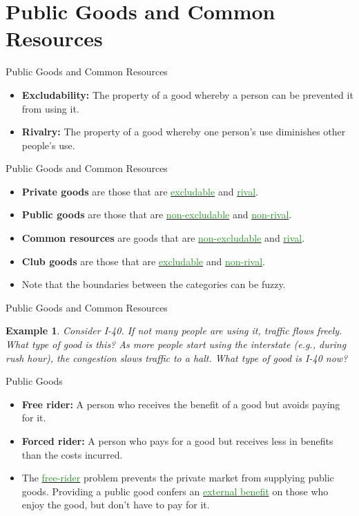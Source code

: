 \documentclass[xcolor={dvipsnames},pdf, hyperref={colorlinks=true, citecolor=ForestGreen, linkcolor=BlueViolet, urlcolor=Magenta}]{beamer}
\newtheorem{exmp}{Example}[section]
\newcommand{\defn}[1]{\textbf{#1}}
\newcommand{\ddp}[1]{{\textcolor{ForestGreen}{#1}}}
\newcommand{\dd}[1]{{\underline{\textcolor{ForestGreen}{#1}}}}
\begin{document}
\section{Public Goods and Common Resources}

\begin{frame}{Public Goods and Common Resources}
\begin{itemize}
	\item \defn{Excludability:} The property of a good whereby a person can be prevented it from using it.
	\item \defn{Rivalry:} The property of a good whereby one person's use diminishes other people's use.
\end{itemize}
\end{frame}

\begin{frame}{Public Goods and Common Resources}
	\begin{itemize}
		\item \textbf{Private goods} are those that are \dd{excludable} and \dd{rival}.
		\item \textbf{Public goods} are those that are \dd{non-excludable} and \dd{non-rival}.
		\item \textbf{Common resources} are goods that are \dd{non-excludable} and \dd{rival}.
		\item \textbf{Club goods} are those that are \dd{excludable} and \dd{non-rival}.
		\item Note that the boundaries between the categories can be fuzzy.
	\end{itemize}
\end{frame}

\begin{frame}{Public Goods and Common Resources}

	\begin{exmp} 
		Consider I-40. If not many people are using it, traffic flows freely. What type of good is this? As more people start using the interstate (e.g., during rush hour), the congestion slows traffic to a halt. What type of good is I-40 now?
	\end{exmp}
\pause	\ddp{Originally: public good. With congestion: common resource}
	
\end{frame}

\begin{frame}{Public Goods}
	\begin{itemize}
		\item 	\defn{Free rider:} A person who receives the benefit of a good but avoids paying for it.
		\item \defn{Forced rider:} A person who pays for a good but receives less in benefits than the costs incurred.
		\item The \dd{free-rider} problem prevents the private market from supplying public goods. Providing a public good confers an \dd{external benefit} on those who enjoy the good, but don't have to pay for it. 
	\end{itemize}
\end{frame}
\end{document}
